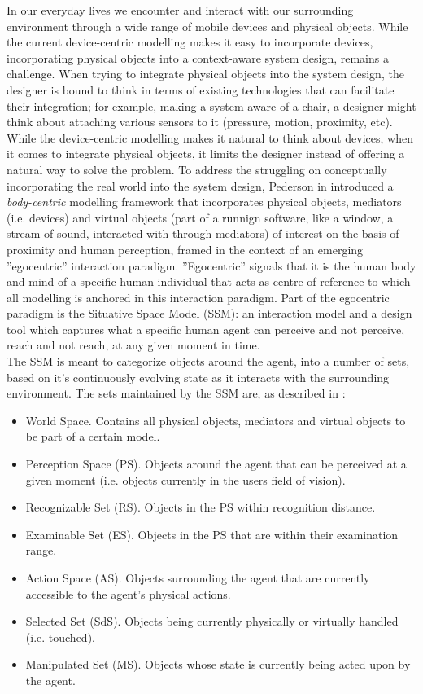 In our everyday lives we encounter and interact with our surrounding environment through a wide range of mobile devices and physical objects. While the current device-centric modelling makes it easy to incorporate devices, incorporating physical objects into a context-aware system design, remains a challenge. When trying to integrate physical objects into the system design, the designer is bound to think in terms of existing technologies that can facilitate their integration; for example, making a system aware of a chair, a designer might think about attaching various sensors to it (pressure, motion, proximity, etc). While the device-centric modelling makes it natural to think about devices, when it comes to integrate physical objects, it limits the designer instead of offering a natural way to solve the problem. To address the struggling on conceptually incorporating the real world into the system design, Pederson in \cite{pederson2010towards} introduced a \emph{body-centric} modelling framework that incorporates physical objects, mediators (i.e. devices) and virtual objects (part of a runnign software, like a window, a stream of sound, interacted with through mediators) of interest on the basis of proximity and human perception, framed in the context of an emerging ''egocentric'' interaction paradigm. ''Egocentric'' signals that it is the human body and mind of a specific human individual that acts as centre of reference to which all modelling is anchored in this interaction paradigm. Part of the egocentric paradigm is the Situative Space Model (SSM): an interaction model and a design tool which captures what a specific human agent can perceive and not perceive, reach and not reach, at any given moment in time.\\

The SSM is meant to categorize objects around the agent, into a number of sets, based on it's continuously evolving state as it interacts with the surrounding environment. The sets maintained by the SSM are, as described in \cite{pederson2010towards}:
\begin{itemize}
	\item World Space. Contains all physical objects, mediators and virtual objects to be part of a certain model.
	\item Perception Space (PS). Objects around the agent that can be perceived at a given moment (i.e. objects currently in the users field of vision).
	\item Recognizable Set (RS). Objects in the PS within recognition distance.
	\item Examinable Set (ES). Objects in the PS that are within their examination range.
	\item Action Space (AS). Objects surrounding the agent that are currently accessible to the agent's physical actions.
	\item Selected Set (SdS). Objects being currently physically or virtually handled (i.e. touched).
	\item Manipulated Set (MS). Objects whose state is currently being acted upon by the agent.
\end{itemize}

